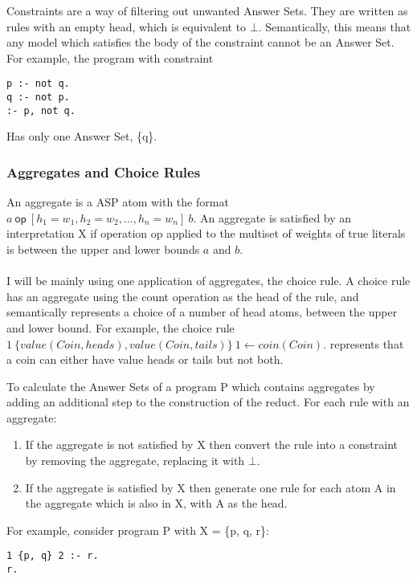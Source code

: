 Constraints are a way of filtering out unwanted Answer Sets. They are written as rules with an empty head, which is equivalent to $\bot$. Semantically, this means that any model which satisfies the body of the constraint cannot be an Answer Set. For example, the program with constraint

\begin{lstlisting}
p :- not q.
q :- not p.
:- p, not q.
\end{lstlisting}

Has only one Answer Set, \{q\}.

\subsubsection{Aggregates and Choice Rules}

An aggregate is a ASP atom with the format $a \: \textsf{op} \: [h_1=w_1, h_2=w_2, \dots, h_n=w_n 	] \: b$. An aggregate is satisfied by an interpretation X if operation op applied to the multiset of weights of true literals is between the upper and lower bounds $a$ and $b$. \\ \\

I will be mainly using one application of aggregates, the choice rule. A choice rule has an aggregate using the count operation as the head of the rule, and semantically represents a choice of a number of head atoms, between the upper and lower bound. For example, the choice rule $1 \: \{ value(Coin, heads), value(Coin, tails)\} \: 1 \gets coin(Coin).$ represents that a coin can either have value heads or tails but not both.

To calculate the Answer Sets of a program P which contains aggregates by adding an additional step to the construction of the reduct. For each rule with an aggregate:

\begin{enumerate}
\item If the aggregate is not satisfied by X then convert the rule into a constraint by removing the aggregate, replacing it with $\bot$.
\item If the aggregate is satisfied by X then generate one rule for each atom A in the aggregate which is also in X, with A as the head.
\end{enumerate}

For example, consider program P with X = \{p, q, r\}:

\begin{lstlisting}
1 {p, q} 2 :- r.
r.
\end{lstlisting}

